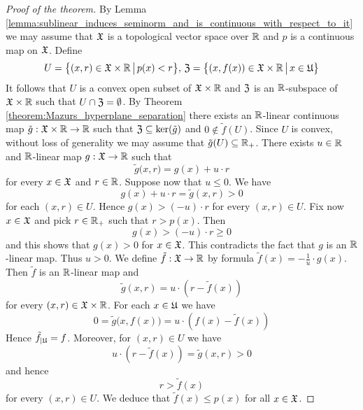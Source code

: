 \begin{proof}[Proof of the theorem]
By Lemma \ref{lemma:sublinear_induces_seminorm_and_is_continuous_with_respect_to_it} we may assume that ${\mathfrak X}$ is a topological vector space over ${\mathbb R}$ and $p$ is a continuous map on ${\mathfrak X}$. Define
$$U = \big\{(x,r)\in {\mathfrak X}\times {\mathbb R}\,\big|\,p(x) < r\big\},\,{\mathfrak Z} = \big\{(x,f(x))\in {\mathfrak X}\times {\mathbb R}\,\big|\,x\in {\mathfrak U}\big\}$$ 
It follows that $U$ is a convex open subset of ${\mathfrak X}\times {\mathbb R}$ and ${\mathfrak Z}$ is an ${\mathbb R}$-subspace of ${\mathfrak X}\times {\mathbb R}$ such that $U \cap {\mathfrak Z} = \emptyset$. By Theorem \ref{theorem:Mazurs_hyperplane_separation} there exists an ${\mathbb R}$-linear continuous map $\tilde{g}:{\mathfrak X}\times {\mathbb R}\rightarrow {\mathbb R}$ such that ${\mathfrak Z}\subseteq \ker(\tilde{g})$ and $0 \not \in \tilde{f}(U)$. Since $U$ is convex, without loss of generality we may assume that $\tilde{g}(U)\subseteq {\mathbb R}_+$. There exists $u \in {\mathbb R}$ and ${\mathbb R}$-linear map $g:{\mathfrak X}\rightarrow {\mathbb R}$ such that 
$$\tilde{g}\big(x, r\big) = g(x) + u\cdot r$$
for every $x \in {\mathfrak X}$ and $r \in {\mathbb R}$. Suppose now that $u \leq 0$. We have
$$g(x) + u\cdot r = \tilde{g}(x,r) > 0$$
for each $(x,r) \in U$. Hence $g(x) > (- u) \cdot r$ for every $(x,r) \in U$. Fix now $x\in {\mathfrak X}$ and pick $r \in {\mathbb R}_+$ such that $r > p(x)$. Then 
$$g(x) > (-u)\cdot r \geq 0$$ 
and this shows that $g(x) > 0$ for $x\in {\mathfrak X}$. This contradicts the fact that $g$ is an ${\mathbb R}$-linear map. Thus $u > 0$. We define $\tilde{f}:{\mathfrak X}\rightarrow {\mathbb R}$ by formula $\tilde{f}(x) = -\frac{1}{u}\cdot g(x)$. Then $\tilde{f}$ is an ${\mathbb R}$-linear map and $$\tilde{g}(x, r) = u \cdot \left(r - \tilde{f}(x)\right)$$
for every $(x,r) \in {\mathfrak X}\times {\mathbb R}$. For each $x \in {\mathfrak U}$ we have
$$0 = \tilde{g}\big(x,f(x)\big) = u \cdot \left(f(x) - \tilde{f}(x)\right)$$
Hence $\tilde{f}_{\mid {\mathfrak U}} = f$. Moreover, for $(x,r) \in U$ we have 
$$u\cdot \left(r - \tilde{f}(x)\right) = \tilde{g}(x, r) > 0$$
and hence
$$r > \tilde{f}(x)$$
for every $(x,r)\in U$. We deduce that $\tilde{f}(x) \leq p(x)$ for all $x\in {\mathfrak X}$. 
\end{proof}













\small




